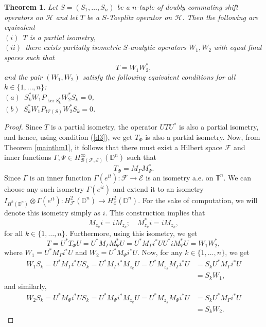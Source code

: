 \documentclass[12pt]{amsart}
\newtheorem{thm}[propn]{Theorem}
\theoremstyle{definition}
\newcommand{\D}{\mathbb{D}}
\newcommand{\1}{{\mbox{\bf 1}}}
\newcommand{\clb}{\mathcal{B}}
\newcommand{\cle}{\mathcal{E}}
\newcommand{\clf}{\mathcal{F}}
\newcommand{\clh}{\mathcal{H}}
\newcommand{\clw}{\mathcal{W}}
\newcommand{\raro}{\rightarrow}
\begin{document}
\begin{thm}
Let $S=(S_1,\ldots,S_n)$ be a $n$-tuple of doubly commuting shift operators on $\clh$ and let $T$ be a $S$-Toeplitz operator on $\clh$. Then the following are equivalent\\
$(i)$~$T$ is a partial isometry,\\
$(ii)$~there exists partially isometric $S$-analytic operators $W_1, W_2$ with equal final spaces such that
\[
T = W_1 W_2^*,
\]
and the pair $(W_1,W_2)$ satisfy the following equivalent conditions for all $k \in \{1,\ldots, n\}$:\\
$(a)$~$S_k^* W_1 P_{\ker S_k^*} W_2^* S_k = 0$, \\
$(b)$~$S_k^* W_1  P_{\clw(S)} W_2^* S_k = 0$.
\end{thm}
\begin{proof}
Since $T$ is a partial isometry, the operator $UTU^*$ is also a partial isometry, and hence, using condition (\ref{d3}), we get $T_{\Phi}$ is also a partial isometry. Now, from Theorem \ref{mainthm1}, it follows that there must exist a Hilbert space $\clf$ and inner functions $\Gamma, \Psi \in H_{\clb(\clf,\cle)}^{\infty}(\D^n)$ such that
\[
T_{\Phi} = M_{\Gamma}M_{\Psi}^*.
\]
Since $\Gamma$ is an inner function $\Gamma(e^{it}):\clf \raro \cle$ is an isometry a.e. on $\mathbb{T}^n$. We can choose any such isometry $\Gamma(e^{it})$ and extend it to an isometry $I_{H^2(\D^n)} \otimes \Gamma(e^{it}): H_{\clf}^2(\D^n) \raro H_{\cle}^2(\D^n)$. For the sake of computation, we will denote this isometry simply as $i$. This construction implies that
\begin{equation}\label{inter2}
M_{z_k} i = i M_{z_k}; \quad M_{z_k}^* i = i M_{z_k},
\end{equation}
for all $k \in \{1,\ldots,n\}$.  Furthermore, using this isometry, we get 
\[
T = U^*T_{\Phi}U = U^* M_{\Gamma}M_{\Psi}^* U = U^* M_{\Gamma}i^* UU^* i M_{\Psi}^*U = W_1 W_2^*,
\]
where $W_1 = U^* M_{\Gamma}i^*U$ and $W_2 = U^* M_{\Psi}i^* U$.  Now, for any $k \in \{1,\ldots,n\}$, we get
\begin{align*}
W_1 S_k = U^* M_{\Gamma}i^*U S_k = U^* M_{\Gamma}i^* M_{z_k} U = U^* M_{z_k} M_{\Gamma}i^* U &= S_k U^* M_{\Gamma}i^* U\\
&= S_k W_1,
\end{align*}
and similarly,
\begin{align*}
W_2 S_k = U^* M_{\Psi}i^*U S_k = U^* M_{\Psi}i^* M_{z_k} U = U^* M_{z_k} M_{\Psi}i^* U &= S_k U^* M_{\Gamma}i^* U \\
&= S_k W_2.
\end{align*}

\end{proof}
\end{document}

